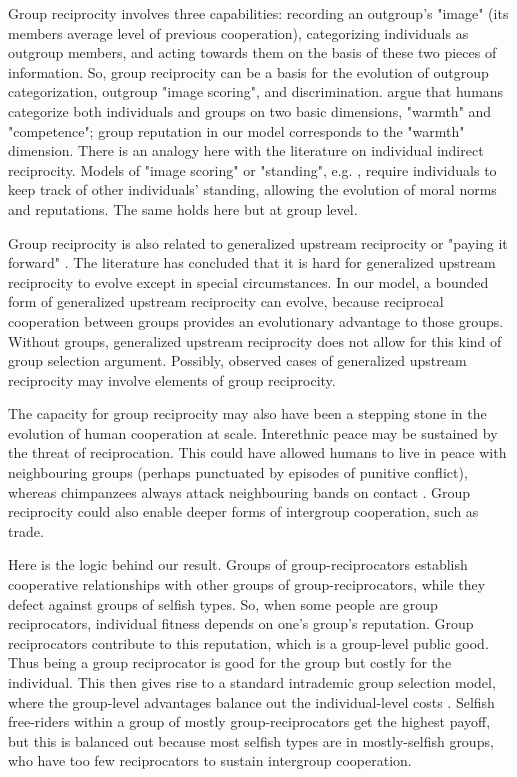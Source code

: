 \documentclass[12pt,a4paper]{article}
\begin{document}
Group reciprocity involves three capabilities: recording an outgroup's "image"
(its members average level of previous cooperation), categorizing individuals
as outgroup members, and acting towards them on the basis of these two pieces of
information. So, group reciprocity can be a basis for the evolution of outgroup 
categorization, outgroup "image scoring", and discrimination. \cite{fiske2007universal}
argue that humans categorize both individuals and groups on two basic dimensions, 
"warmth" and "competence"; group reputation in our model corresponds to the "warmth" dimension.
There is an analogy here with the literature on individual indirect reciprocity. Models
of "image scoring" or "standing", e.g. \cite{nowak2005evolution},
require individuals to keep track of other individuals' standing, allowing the 
evolution of moral norms and reputations. The same holds here but at group level.

Group reciprocity is also related to generalized upstream reciprocity 
or "paying it forward" \parencite{boyd1989evolution,nowak2007upstream}. The 
literature has concluded that it is hard for 
generalized upstream reciprocity to evolve except in special circumstances. In
our model, a bounded form of generalized upstream reciprocity can evolve, 
because reciprocal cooperation between groups provides an evolutionary advantage
to those groups. Without groups, generalized upstream reciprocity does not allow
for this kind of group selection argument. Possibly, observed cases
of generalized upstream reciprocity 
\parencite[e.g.][]{mujcic2018indirect,yuan2019gift} may involve elements 
of group reciprocity.

The capacity for group reciprocity may also have been a stepping stone in the evolution 
of human cooperation at scale. Interethnic 
peace may be sustained by the threat of reciprocation. This could have allowed
humans to live in peace with neighbouring groups (perhaps punctuated by episodes of
punitive conflict), whereas chimpanzees always attack neighbouring bands on 
contact \parencite{wrangham2012intergroup}. Group reciprocity could also enable 
deeper forms of intergroup cooperation, such as trade.

Here is the logic behind our result. Groups of group-reciprocators
establish cooperative relationships with other groups of group-reciprocators,
while they defect against groups of selfish types. So, when some people are 
group reciprocators, individual fitness depends on one's group's reputation. Group 
reciprocators contribute to this reputation, which is a group-level public good. 
Thus being a group reciprocator is good for the group but costly for the individual. 
This then gives rise to a standard intrademic group selection model, where the 
group-level advantages balance out the individual-level costs 
\parencite{wilson1983group,wade1978critical}. Selfish free-riders within a group 
of mostly group-reciprocators get the highest payoff, but this is balanced
out because most selfish types are in mostly-selfish groups, who have too
few reciprocators to sustain intergroup cooperation.
\end{document}
